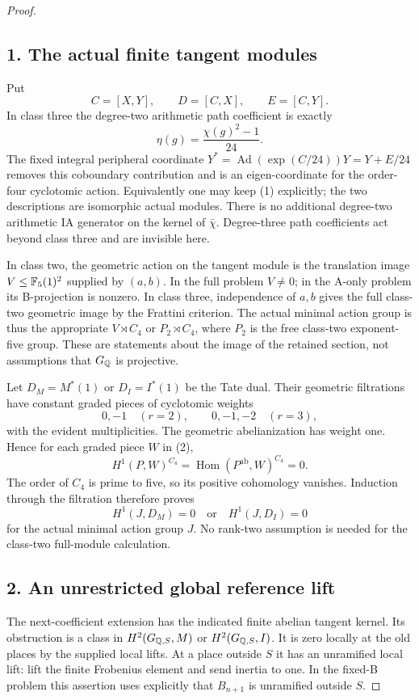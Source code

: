 \documentclass[11pt]{article}
\begin{document}
\begin{proof}
\subsection*{1. The actual finite tangent modules}
Put
\[
 C=[X,Y],\qquad D=[C,X],\qquad E=[C,Y].
\]
In class three the degree-two arithmetic path coefficient is exactly
\[
 \eta(g)=\frac{\chi(g)^2-1}{24}.
 \tag{1}
\]
The fixed integral peripheral coordinate $Y^*=\operatorname{Ad}(\exp(C/24))Y=Y+E/24$ removes this coboundary contribution and is an eigen-coordinate for the order-four cyclotomic action. Equivalently one may keep (1) explicitly; the two descriptions are isomorphic actual modules. There is no additional degree-two arithmetic IA generator on the kernel of $\bar\chi$. Degree-three path coefficients act beyond class three and are invisible here.

In class two, the geometric action on the tangent module is the translation image $V\le\mathbb F_5(1)^2$ supplied by $(a,b)$. In the full problem $V\ne0$; in the A-only problem its B-projection is nonzero. In class three, independence of $a,b$ gives the full class-two geometric image by the Frattini criterion. The actual minimal action group is thus the appropriate $V\rtimes C_4$ or $P_2\rtimes C_4$, where $P_2$ is the free class-two exponent-five group. These are statements about the image of the retained section, not assumptions that $G_\mathbb Q$ is projective.

Let $D_M=M^*(1)$ or $D_I=I^*(1)$ be the Tate dual. Their geometric filtrations have constant graded pieces of cyclotomic weights
\[
 0,-1 \quad(r=2),\qquad 0,-1,-2 \quad(r=3),
 \tag{2}
\]
with the evident multiplicities. The geometric abelianization has weight one. Hence for each graded piece $W$ in (2),
\[
 H^1(P,W)^{C_4}=\operatorname{Hom}(P^{\mathrm{ab}},W)^{C_4}=0.
\]
The order of $C_4$ is prime to five, so its positive cohomology vanishes. Induction through the filtration therefore proves
\[
 H^1(J,D_M)=0\quad\text{or}\quad H^1(J,D_I)=0
 \tag{3}
\]
for the actual minimal action group $J$. No rank-two assumption is needed for the class-two full-module calculation.

\subsection*{2. An unrestricted global reference lift}
The next-coefficient extension has the indicated finite abelian tangent kernel. Its obstruction is a class in $H^2(G_{\mathbb Q,S},M)$ or $H^2(G_{\mathbb Q,S},I)$. It is zero locally at the old places by the supplied local lifts. At a place outside $S$ it has an unramified local lift: lift the finite Frobenius element and send inertia to one. In the fixed-B problem this assertion uses explicitly that $B_{n+1}$ is unramified outside $S$.


\end{proof}
\end{document}
